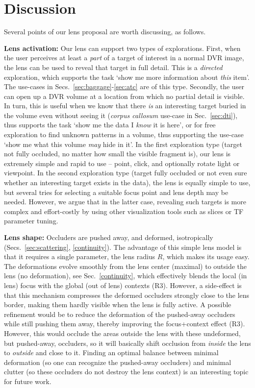 \section{Discussion}
\label{sec:discussion}
%
%
Several points of our lens proposal are worth discussing, as follows.

\vspace{0.15cm}
\noindent\textbf{Lens activation:} Our lens can support two types of explorations. First, when the user perceives at least a \emph{part} of a target of interest in a normal DVR image, the lens can be used to reveal that target in full detail. This is a \emph{directed} exploration, which supports the task `show me more information about \emph{this} item'. The use-cases in Secs.~\ref{sec:baggage}-\ref{sec:atc} are of this type. Secondly, the user can open up a DVR volume at a location from which no partial detail is visible. In turn, this is useful when we know that there \emph{is} an interesting target buried in the volume even without seeing it (\emph{corpus callosum} use-case in Sec.~\ref{sec:dti}), thus supports the task `show me the data I \emph{know} it is here', or for free exploration to find unknown patterns in a volume, thus supporting the use-case `show me what this volume \emph{may} hide in it'. 
In the first exploration type (target not fully occluded, no matter how small the visible fragment is), our lens is extremely simple and rapid to use -- point, click, and optionally rotate light or viewpoint. In the second exploration type (target fully occluded or not even sure whether an interesting target exists in the data), the lens is equally simple to use, but several tries for selecting a suitable focus point and lens depth may be needed. However, we argue that in the latter case, revealing such targets is more complex and effort-costly by using other visualization tools such as slices or TF parameter tuning.

\vspace{0.15cm}
\noindent\textbf{Lens shape:} Occluders are pushed away, and deformed, isotropically (Secs.~\ref{sec:scattering}, \ref{continuity}). The advantage of this simple lens model is that it requires a single parameter, the lens radius $R$, which makes its usage easy. The deformations evolve smoothly from the lens center (maximal) to outside the lens (no deformation), see Sec.~\ref{continuity}, which effectively blends the local (in lens) focus with the global (out of lens) contexts (R3). However, a side-effect is that this mechanism compresses the deformed occluders strongly close to the lens border, making them hardly visible when the lens is fully active. A possible refinement would be to reduce the deformation of the pushed-away occluders while still pushing them away, thereby improving the focus+context effect (R3). However, this would occlude the areas outside the lens with these undeformed, but pushed-away, occluders, so it will basically shift occlusion from \emph{inside} the lens to \emph{outside} and close to it. Finding an optimal balance between minimal deformation (so one can recognize the pushed-away occluders) and minimal clutter (so these occluders do not destroy the lens context) is an interesting topic for future work.

